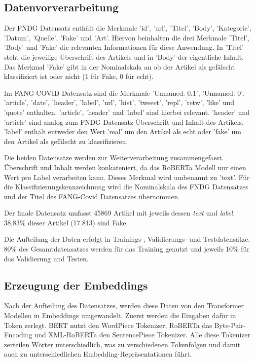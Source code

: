 \subsection{Datenvorverarbeitung} \label{sec6:datenvorverarbeitung}

Der FNDG Datensatz enthält die Merkmale 'id', 'url', 'Titel', 'Body', 'Kategorie', 'Datum', 'Quelle', 'Fake' und 'Art'.
Hiervon beinhalten die drei Merkmale 'Titel', 'Body' und 'Fake' die relevanten Informationen für diese Anwendung.
In 'Titel' steht die jeweilige Überschrift des Artikels und in 'Body' der eigentliche Inhalt. Das Merkmal 'Fake' gibt in der Nominalskala
an ob der Artikel als gefälscht klassifiziert ist oder nicht (1 für Fake, 0 für echt).

Im FANG-COVID Datensatz sind die Merkmale 'Unnamed: 0.1', 'Unnamed: 0', 'article', 'date', 'header', 'label', 'url', 'hist', 'tweeet', 'repl', 'retw', 'like' und 'quote'
enthalten. 'article', 'header' und 'label' sind hierbei relevant. 'header' und 'article' sind analog zum FNDG Datensatz Überschrift und Inhalt
des Artikels. 'label' enthält entweder den Wert 'real' um den Artikel als echt oder 'fake' um den Artikel als gefälscht zu klassifizieren.

Die beiden Datensatze werden zur Weiterverarbeitung zusammengefasst. Überschrift und Inhalt werden konkateniert, da das RoBERTa Modell nur
einen Wert pro Label verarbeiten kann. Dieses Merkmal wird umbenannt zu 'text'. 
Für die Klassifizierungskennzeichnung wird die Nominalskala des FNDG Datensatzes und der Titel des FANG-Covid Datensatzes übernommen.

Der finale Datensatz umfasst 45869 Artikel mit jeweils dessen \textit{text} und \textit{label}.
38,83\% dieser Artikel (17.813) sind Fake. 

Die Aufteilung der Daten erfolgt in Trainings-, Validierungs- und Testdatensätze. 
80\% des Gesamtdatensatzes werden für das Training genutzt und jeweils 10\% für das Validierung und Testen.

\subsection{Erzeugung der Embeddings}

Nach der Aufteilung des Datensatzes, werden diese Daten von den Transformer Modellen in Embeddings umgewandelt.
Zuerst werden die Eingaben dafür in Token zerlegt.
BERT nutzt den WordPiece Tokenizer, RoBERTa das Byte-Pair-Encoding und XML-RoBERTa den SentencePiece Tokenizer.
Alle diese Tokenizer zerteilen Wörter unterschiedlich, was zu verschiedenen Tokenfolgen und damit auch zu unterschiedlichen Embedding-Repräsentationen führt.

